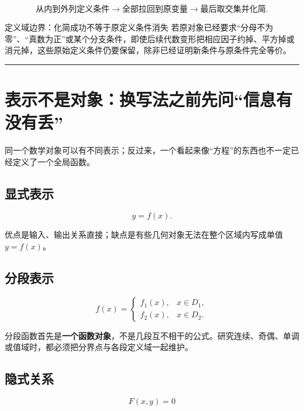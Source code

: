 \documentclass[11pt,a4paper]{ctexart}
\begin{document}
\[
\boxed{
\text{从内到外列定义条件}
\to
\text{全部拉回到原变量}
\to
\text{最后取交集并化简}.
}
\]

\begin{warnbox}{定义域边界：化简成功不等于原定义条件消失}
若原对象已经要求``分母不为零''、``真数为正''或某个分支条件，即使后续代数变形把相应因子约掉、平方掉或消元掉，这些原始定义条件仍要保留，除非已经证明新条件与原条件完全等价。
\end{warnbox}

\begin{center}\rule{0.5\linewidth}{0.5pt}\end{center}

\section{表示不是对象：换写法之前先问``信息有没有丢''}\label{ux8868ux793aux4e0dux662fux5bf9ux8c61ux6362ux5199ux6cd5ux4e4bux524dux5148ux95eeux4fe1ux606fux6709ux6ca1ux6709ux4e22}

同一个数学对象可以有不同表示；反过来，一个看起来像``方程''的东西也不一定已经定义了一个全局函数。

\subsection{显式表示}\label{ux663eux5f0fux8868ux793a}

\[
y=f(x).
\]

优点是输入、输出关系直接；缺点是有些几何对象无法在整个区域内写成单值
\(y=f(x)\)。

\subsection{分段表示}\label{ux5206ux6bb5ux8868ux793a}

\[
f(x)=
\begin{cases}
f_1(x),&x\in D_1,\\
f_2(x),&x\in D_2.
\end{cases}
\]

分段函数首先是\textbf{一个函数对象}，不是几段互不相干的公式。研究连续、奇偶、单调或值域时，都必须把分界点与各段定义域一起维护。

\subsection{隐式关系}\label{ux9690ux5f0fux5173ux7cfb}

\[
F(x,y)=0
\]
\end{document}
